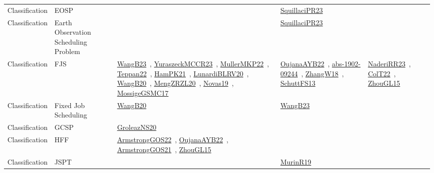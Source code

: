 {\begin{longtable}{lp{3cm}>{\raggedright\arraybackslash}p{6cm}>{\raggedright\arraybackslash}p{6cm}>{\raggedright\arraybackslash}p{8cm}}
Classification & EOSP &  & \href{works/SquillaciPR23.pdf}{SquillaciPR23}~\cite{SquillaciPR23} & \\
Classification & Earth Observation Scheduling Problem &  & \href{works/SquillaciPR23.pdf}{SquillaciPR23}~\cite{SquillaciPR23} & \\
Classification & FJS & \href{works/WangB23.pdf}{WangB23}~\cite{WangB23}, \href{works/YuraszeckMCCR23.pdf}{YuraszeckMCCR23}~\cite{YuraszeckMCCR23}, \href{works/MullerMKP22.pdf}{MullerMKP22}~\cite{MullerMKP22}, \href{works/Teppan22.pdf}{Teppan22}~\cite{Teppan22}, \href{works/HamPK21.pdf}{HamPK21}~\cite{HamPK21}, \href{works/LunardiBLRV20.pdf}{LunardiBLRV20}~\cite{LunardiBLRV20}, \href{works/WangB20.pdf}{WangB20}~\cite{WangB20}, \href{works/MengZRZL20.pdf}{MengZRZL20}~\cite{MengZRZL20}, \href{works/Novas19.pdf}{Novas19}~\cite{Novas19}, \href{works/MossigeGSMC17.pdf}{MossigeGSMC17}~\cite{MossigeGSMC17} & \href{works/OujanaAYB22.pdf}{OujanaAYB22}~\cite{OujanaAYB22}, \href{works/abs-1902-09244.pdf}{abs-1902-09244}~\cite{abs-1902-09244}, \href{works/ZhangW18.pdf}{ZhangW18}~\cite{ZhangW18}, \href{works/SchuttFS13.pdf}{SchuttFS13}~\cite{SchuttFS13} & \href{works/NaderiRR23.pdf}{NaderiRR23}~\cite{NaderiRR23}, \href{works/ColT22.pdf}{ColT22}~\cite{ColT22}, \href{works/ZhouGL15.pdf}{ZhouGL15}~\cite{ZhouGL15}\\
Classification & Fixed Job Scheduling & \href{works/WangB20.pdf}{WangB20}~\cite{WangB20} & \href{works/WangB23.pdf}{WangB23}~\cite{WangB23} & \\
Classification & GCSP & \href{works/GroleazNS20.pdf}{GroleazNS20}~\cite{GroleazNS20} &  & \\
Classification & HFF & \href{works/ArmstrongGOS22.pdf}{ArmstrongGOS22}~\cite{ArmstrongGOS22}, \href{works/OujanaAYB22.pdf}{OujanaAYB22}~\cite{OujanaAYB22}, \href{works/ArmstrongGOS21.pdf}{ArmstrongGOS21}~\cite{ArmstrongGOS21}, \href{works/ZhouGL15.pdf}{ZhouGL15}~\cite{ZhouGL15} &  & \\
Classification & JSPT &  & \href{works/MurinR19.pdf}{MurinR19}~\cite{MurinR19} & \\

\end{longtable}}
